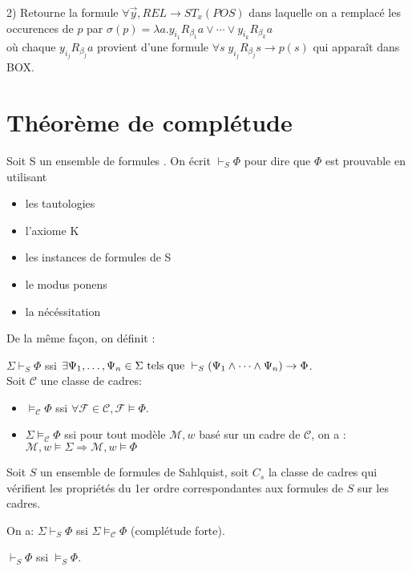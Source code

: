 \documentclass[10pt,a4paper]{article}
\newcommand{\F}{\mathcal{F}}
\begin{document}
2) Retourne la formule $\forall \vec y, REL \rightarrow ST_x(POS)$ dans laquelle on a remplacé les occurences de $p$ par 
$\sigma(p)=\lambda a . y_{i_1} R_{\beta_1} a \vee \cdots \vee y_{i_k} R_{\beta_k} a$\\
où chaque $y_{i_j} R_{\beta_j} a$ provient d'une formule $\forall s \; y_{i_j} R_{\beta_j} s \rightarrow p(s)$ qui apparaît dans BOX.

\section{Théorème de complétude}

Soit S un ensemble de formules . On écrit $\vdash_S \Phi$ pour dire que $\Phi$ est prouvable en utilisant 
\begin{itemize}
 \item les tautologies
 \item l'axiome K
 \item les instances de formules de S
 \item le modus ponens
 \item la nécéssitation
\end{itemize}
\begin{rem}

De la même façon, on définit :

$\Sigma \vdash_S \Phi$ ssi $\exists \Psi_1, \dots, \Psi_n \in \Sigma \tq[s] \vdash_S ( \Psi_1 \wedge \dots \wedge \Psi_n) \rightarrow \Phi$.\\
Soit $\mathcal{C}$ une classe de cadres:
\begin{itemize}
 \item $\models_{\mathcal{C}} \Phi$ ssi $\forall \F \in \mathcal{C}, \F \models \Phi$.
 \item $\Sigma \models_{\mathcal{C}} \Phi$ ssi pour tout modèle $\mathcal{M}, w$ basé sur un cadre de $\mathcal{C}$, on a :\\
$\mathcal{M}, w \models \Sigma \Rightarrow \mathcal{M}, w \models \Phi$
\end{itemize}
\end{rem}

\begin{thm}
Soit $S$ un ensemble de formules de Sahlquist, soit $C_s$ la classe de cadres qui vérifient les propriétés du 1er ordre correspondantes aux formules de $S$ sur les cadres.

On a:  $\Sigma \vdash_S \Phi$ ssi $\Sigma \models_{\mathcal{C}} \Phi$ (complétude forte).
\end{thm}
\begin{rem} 
$\vdash_S \Phi$ ssi $\models_S \Phi$.
\end{rem}
\end{document}

